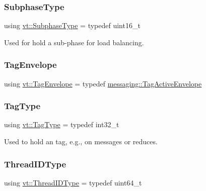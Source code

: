 \mbox{\label{namespacevt_ae78cbfdf1e57470e33eedb074f2beeba}} 
\subsubsection{\texorpdfstring{Subphase\+Type}{SubphaseType}}
{\footnotesize\ttfamily using \hyperlink{namespacevt_ae78cbfdf1e57470e33eedb074f2beeba}{vt\+::\+Subphase\+Type} = typedef uint16\+\_\+t}



Used for hold a sub-\/phase for load balancing. 

\mbox{\label{namespacevt_a7b951ab92dca9319e12e3fc406ccb309}} 
\subsubsection{\texorpdfstring{Tag\+Envelope}{TagEnvelope}}
{\footnotesize\ttfamily using \hyperlink{namespacevt_a7b951ab92dca9319e12e3fc406ccb309}{vt\+::\+Tag\+Envelope} = typedef \hyperlink{structvt_1_1messaging_1_1_tag_active_envelope}{messaging\+::\+Tag\+Active\+Envelope}}

\mbox{\label{namespacevt_a84ab281dae04a52a4b243d6bf62d0e52}} 
\subsubsection{\texorpdfstring{Tag\+Type}{TagType}}
{\footnotesize\ttfamily using \hyperlink{namespacevt_a84ab281dae04a52a4b243d6bf62d0e52}{vt\+::\+Tag\+Type} = typedef int32\+\_\+t}



Used to hold an tag, e.\+g., on messages or reduces. 

\mbox{\label{namespacevt_a9b887d814dd25ff495a0c8270304ac02}} 
\subsubsection{\texorpdfstring{Thread\+I\+D\+Type}{ThreadIDType}}
{\footnotesize\ttfamily using \hyperlink{namespacevt_a9b887d814dd25ff495a0c8270304ac02}{vt\+::\+Thread\+I\+D\+Type} = typedef uint64\+\_\+t}



